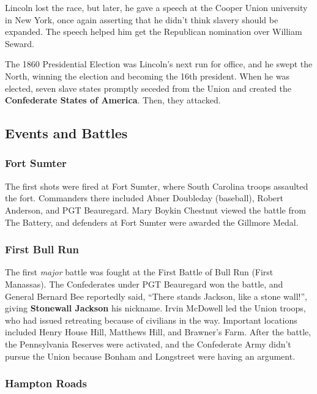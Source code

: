 Lincoln lost the race, but later, he gave a speech at the Cooper Union university in New York,
once again asserting that he didn't think slavery should be expanded.
The speech helped him get the Republican nomination over William Seward.

The 1860 Presidential Election was Lincoln's next run for office, and he swept the North,
winning the election and becoming the 16th president.
When he was elected, seven slave states promptly seceded from the Union
and created the \textbf{Confederate States of America}.
Then, they attacked.


\subsection*{Events and Battles}

\subsubsection*{Fort Sumter}

The first shots were fired at Fort Sumter, where South Carolina troops assaulted the fort.
Commanders there included Abner Doubleday (baseball), Robert Anderson, and PGT Beauregard.
Mary Boykin Chestnut viewed the battle from The Battery,
and defenders at Fort Sumter were awarded the Gillmore Medal.

\subsubsection*{First Bull Run}

The first \textit{major} battle was fought at the First Battle of Bull Run (First Manassas).
The Confederates under PGT Beauregard won the battle,
and General Bernard Bee reportedly said, ``There stands Jackson, like a stone wall!'',
giving \textbf{Stonewall Jackson} his nickname.
Irvin McDowell led the Union troops, who had issued retreating because of civilians in the way.
Important locations included Henry House Hill, Matthews Hill, and Brawner's Farm.
After the battle, the Pennsylvania Reserves were activated,
and the Confederate Army didn't pursue the Union because Bonham and Longstreet were having an argument.

\subsubsection*{Hampton Roads}

